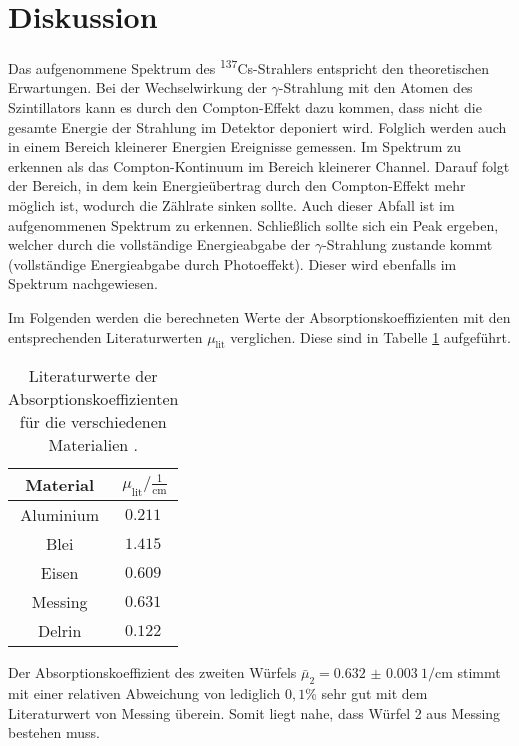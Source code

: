 \section{Diskussion}
\label{sec:Diskussion}

Das aufgenommene Spektrum des \textsuperscript{137}Cs-Strahlers entspricht den
theoretischen Erwartungen. Bei der Wechselwirkung der $\gamma$-Strahlung mit den
Atomen des Szintillators kann es durch den Compton-Effekt dazu kommen, dass
nicht die gesamte Energie der Strahlung im Detektor deponiert wird. Folglich werden
auch in einem Bereich kleinerer Energien Ereignisse gemessen. Im Spektrum zu erkennen
als das Compton-Kontinuum im Bereich kleinerer Channel. Darauf folgt der Bereich,
in dem kein Energieübertrag durch den Compton-Effekt mehr möglich ist, wodurch die
Zählrate sinken sollte. Auch dieser Abfall ist im aufgenommenen Spektrum zu erkennen.
Schließlich sollte sich ein Peak ergeben, welcher durch die vollständige Energieabgabe
der $\gamma$-Strahlung zustande kommt (vollständige Energieabgabe durch Photoeffekt).
Dieser wird ebenfalls im Spektrum nachgewiesen.

Im Folgenden werden die berechneten Werte der Absorptionskoeffizienten mit den
entsprechenden Literaturwerten $\mu_{\mathrm{lit}}$ verglichen. Diese sind in Tabelle \ref{tab:literatur}
aufgeführt.

\begin{table}[H]
  \centering
  \caption{Literaturwerte der Absorptionskoeffizienten für die verschiedenen Materialien \cite{sample2}.}
  \label{tab:literatur}
  \begin{tabular}{c c}
    \toprule
    Material &  $\mu_{\mathrm{lit}} / \frac{1}{\mathrm{cm}}$  \\
    \midrule
        Aluminium    & $\SI{0.211}{}$ \\
        Blei    & $\SI{1.415}{}$ \\
        Eisen & $\SI{0.609}{}$ \\
        Messing    & $\SI{0.631}{}$ \\
        Delrin & $\SI{0.122}{}$ \\
    \bottomrule
  \end{tabular}
\end{table}

Der Absorptionskoeffizient des zweiten Würfels $\bar\mu_2 = \SI{0.632(3)}{1\per\centi\meter}$
stimmt mit einer relativen Abweichung von lediglich $0,1$\% sehr gut mit dem Literaturwert
von Messing überein. Somit liegt nahe, dass Würfel 2 aus Messing bestehen muss.

